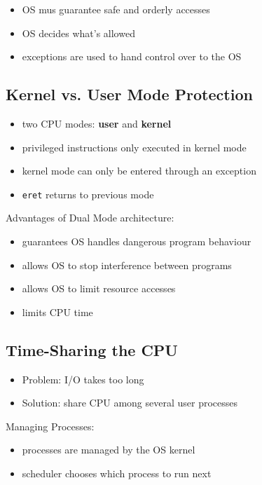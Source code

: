 \documentclass{article}
\newcommand{\T}[1]{\texttt{#1}}
\begin{document}
\begin{itemize}
	\item OS mus guarantee safe and orderly accesses
	\item OS decides what's allowed
	\item exceptions are used to hand control over to the OS
\end{itemize}

\subsection{Kernel vs. User Mode Protection}

\begin{itemize}
	\item two CPU modes: \textbf{user} and \textbf{kernel}
	\item privileged instructions only executed in kernel mode
	\item kernel mode can only be entered through an exception
	\item \T{eret} returns to previous mode
\end{itemize}

Advantages of Dual Mode architecture:
\begin{itemize}
	\item guarantees OS handles dangerous program behaviour
	\item allows OS to stop interference between programs
	\item allows OS to limit resource accesses
	\item limits CPU time
\end{itemize}

\subsection{Time-Sharing the CPU}

\begin{itemize}
	\item Problem: I/O takes too long
	\item Solution: share CPU among several user processes
\end{itemize}

Managing Processes:
\begin{itemize}
	\item processes are managed by the OS kernel 
	\item scheduler chooses which process to run next
\end{itemize}
\end{document}

